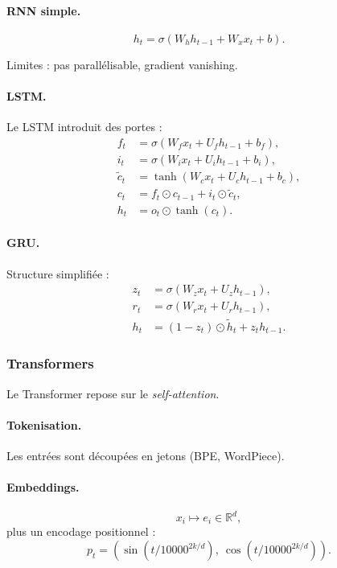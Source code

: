 \documentclass[11pt,a4paper]{article}
\newcommand{\1}{\mathbf{1}}
\begin{document}
\paragraph{RNN simple.}
\[
h_t = \sigma(W_h h_{t-1} + W_x x_t + b).
\]

Limites : pas parallélisable, gradient vanishing.

\paragraph{LSTM.}

Le LSTM introduit des portes :
\[
\begin{aligned}
f_t &= \sigma(W_f x_t + U_f h_{t-1} + b_f),\\
i_t &= \sigma(W_i x_t + U_i h_{t-1} + b_i),\\
\tilde c_t &= \tanh(W_c x_t + U_c h_{t-1} + b_c),\\
c_t &= f_t \odot c_{t-1} + i_t \odot \tilde c_t,\\
h_t &= o_t \odot \tanh(c_t).
\end{aligned}
\]

\paragraph{GRU.}

Structure simplifiée :
\[
\begin{aligned}
z_t &= \sigma(W_z x_t + U_z h_{t-1}),\\
r_t &= \sigma(W_r x_t + U_r h_{t-1}),\\
h_t &= (1-z_t)\odot \tilde h_t + z_t h_{t-1}.
\end{aligned}
\]

\subsubsection{Transformers}

Le Transformer repose sur le \emph{self-attention}.

\paragraph{Tokenisation.}
Les entrées sont découpées en jetons (BPE, WordPiece).

\paragraph{Embeddings.}
\[
x_i \mapsto e_i \in \mathbb{R}^d,
\]
plus un encodage positionnel :
\[
p_t = (\sin(t/10000^{2k/d}),\ \cos(t/10000^{2k/d})).
\]
\end{document}
